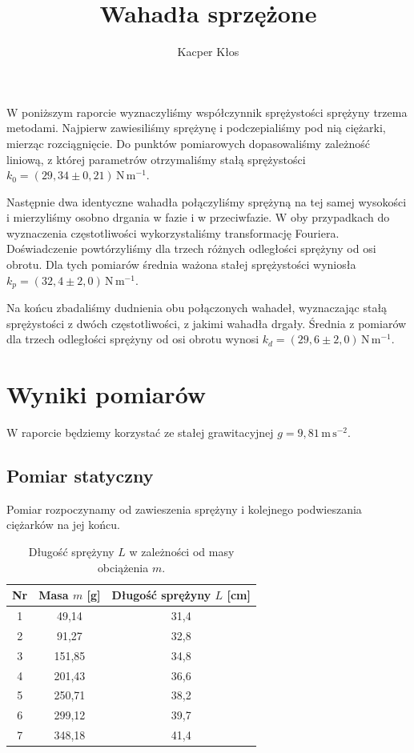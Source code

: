 \documentclass[12pt]{article}
\title{Wahadła sprzężone}
\author{Kacper Kłos}
\begin{document}
\maketitle

W poniższym raporcie wyznaczyliśmy współczynnik sprężystości sprężyny trzema metodami. Najpierw zawiesiliśmy sprężynę i podczepialiśmy pod nią ciężarki, mierząc rozciągnięcie. Do punktów pomiarowych dopasowaliśmy zależność liniową, z której parametrów otrzymaliśmy stałą sprężystości \(k_0 = (29{,}34 \pm 0{,}21)\, \mathrm{N\,m^{-1}}\).

Następnie dwa identyczne wahadła połączyliśmy sprężyną na tej samej wysokości i mierzyliśmy osobno drgania w fazie i w przeciwfazie. W oby przypadkach do wyznaczenia częstotliwości wykorzystaliśmy transformację Fouriera. Doświadczenie powtórzyliśmy dla trzech różnych odległości sprężyny od osi obrotu. Dla tych pomiarów średnia ważona stałej sprężystości wyniosła \(k_p = (32{,}4 \pm 2{,}0)\, \mathrm{N\,m^{-1}}\).

Na końcu zbadaliśmy dudnienia obu połączonych wahadeł, wyznaczając stałą sprężystości z dwóch częstotliwości, z jakimi wahadła drgały. Średnia z pomiarów dla trzech odległości sprężyny od osi obrotu wynosi \(k_d = (29{,}6 \pm 2{,}0)\, \mathrm{N\,m^{-1}}\).

\newpage
\section{Wyniki pomiarów}

W raporcie będziemy korzystać ze stałej grawitacyjnej \(g = 9{,}81\, \mathrm{m\,s^{-2}}\).

\subsection{Pomiar statyczny}
Pomiar rozpoczynamy od zawieszenia sprężyny i kolejnego podwieszania ciężarków na jej końcu.
\begin{table}[H]
	\centering
	\begin{tabular}{c|cc}
		\toprule
		\textbf{Nr} & Masa \(m\) [g] & Długość sprężyny \(L\) [cm] \\
		\midrule
		1           & 49{,}14        & 31{,}4                      \\
		2           & 91{,}27        & 32{,}8                      \\
		3           & 151{,}85       & 34{,}8                      \\
		4           & 201{,}43       & 36{,}6                      \\
		5           & 250{,}71       & 38{,}2                      \\
		6           & 299{,}12       & 39{,}7                      \\
		7           & 348{,}18       & 41{,}4                      \\
		\bottomrule
	\end{tabular}
	\caption{Długość sprężyny \(L\) w zależności od masy obciążenia \(m\).}
	\label{tab:spring_mass}
\end{table}
\end{document}
